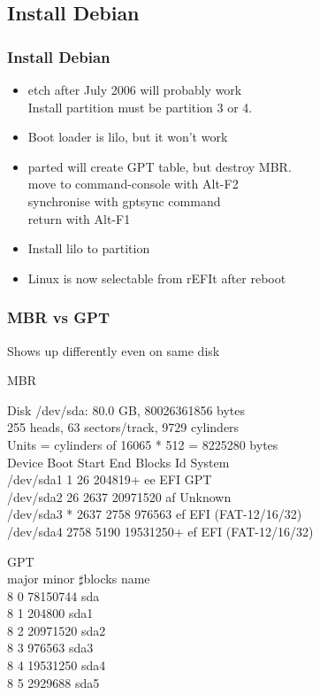 \documentclass[cjk,dvipdfm]{beamer}
\begin{document}
\subsection{Install Debian}

\begin{frame}
 \frametitle{Install Debian}
\begin{itemize}
 \item etch after July 2006 will probably work\\
       Install partition must be partition 3 or 4.
 \item Boot loader is lilo, but it won't work
 \item parted will create GPT table, but destroy MBR.\\
       move to command-console with Alt-F2\\
       synchronise with gptsync command\\
       return with Alt-F1
 \item Install lilo to partition
 \item Linux is now selectable from rEFIt after reboot
\end{itemize}
\end{frame}

\begin{frame}
\frametitle{MBR vs GPT}
Shows up differently even on same disk\\
\begin{minipage}[t]{0.68\hsize} 
MBR

{\scriptsize
 Disk /dev/sda: 80.0 GB, 80026361856 bytes\\
255 heads, 63 sectors/track, 9729 cylinders\\
Units = cylinders of 16065 * 512 = 8225280 bytes\\

   Device Boot      Start         End      Blocks   Id  System\\
/dev/sda1               1          26      204819+  ee  EFI GPT\\
/dev/sda2              26        2637    20971520   af  Unknown\\
/dev/sda3   *        2637        2758      976563   ef  EFI (FAT-12/16/32)\\
/dev/sda4            2758        5190    19531250+  ef  EFI (FAT-12/16/32)\\
}
\end{minipage}
\begin{minipage}[t]{0.30\hsize}
GPT\\

{\small
 major minor  $\sharp{}$blocks  name\\

   8     0   78150744 sda\\
   8     1     204800 sda1\\
   8     2   20971520 sda2\\
   8     3     976563 sda3\\
   8     4   19531250 sda4\\
   8     5    2929688 sda5\\
}
\end{minipage}
\end{frame}
\end{document}
